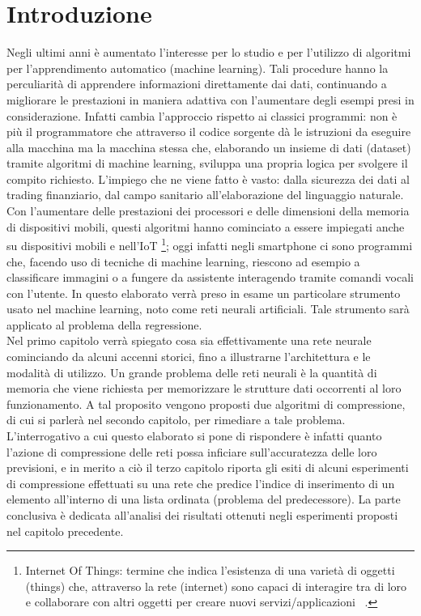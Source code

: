 \documentclass[12pt]{report}
\begin{document}


\tableofcontents

\linespread{1.4}\selectfont

\chapter*{Introduzione}
Negli ultimi anni è aumentato l'interesse per lo studio e per l'utilizzo di algoritmi per l'apprendimento automatico (machine learning). Tali procedure hanno la perculiarità di apprendere informazioni direttamente dai dati, continuando a migliorare le prestazioni in maniera adattiva con l'aumentare degli esempi presi in considerazione. Infatti cambia l'approccio rispetto ai classici programmi: non è più il programmatore che attraverso il codice sorgente dà le istruzioni da eseguire alla macchina ma la macchina stessa che, elaborando un insieme di dati (dataset) tramite algoritmi di machine learning, sviluppa una propria logica per svolgere il compito richiesto.
L'impiego che ne viene fatto è vasto: dalla sicurezza dei dati al trading finanziario, dal campo sanitario all'elaborazione del linguaggio naturale. Con l'aumentare delle prestazioni dei processori e delle dimensioni della memoria di dispositivi mobili, questi algoritmi hanno cominciato a essere impiegati anche su dispositivi mobili e nell'IoT \footnote{Internet Of Things: termine che indica l'esistenza di una varietà di oggetti (things) che, attraverso la rete (internet) sono capaci di interagire tra di loro e collaborare con altri oggetti per creare nuovi servizi/applicazioni ~\cite{IOT}.}; oggi infatti negli smartphone ci sono programmi che, facendo uso di tecniche di machine learning, riescono ad esempio a classificare immagini o a fungere da assistente interagendo tramite comandi vocali con l'utente. 
In questo elaborato verrà preso in esame un particolare strumento usato nel machine learning, noto come reti neurali artificiali. Tale strumento sarà applicato al problema della regressione. \\
Nel primo capitolo verrà spiegato cosa sia effettivamente una rete neurale cominciando da alcuni accenni storici, fino a illustrarne l'architettura e le modalità di utilizzo. Un grande problema delle reti neurali è la quantità di memoria che viene richiesta per memorizzare le strutture dati occorrenti al loro funzionamento. A tal proposito vengono proposti due algoritmi di compressione, di cui si parlerà nel secondo capitolo, per rimediare a tale problema. L'interrogativo a cui questo elaborato si pone di rispondere è infatti quanto l'azione di compressione delle reti possa inficiare sull'accuratezza delle loro previsioni, e in merito a ciò il terzo capitolo riporta gli esiti di alcuni esperimenti di compressione effettuati su una rete che predice l'indice di inserimento di un elemento all'interno di una lista ordinata (problema del predecessore).
La parte conclusiva è dedicata all'analisi dei risultati ottenuti negli esperimenti proposti nel capitolo precedente.
\end{document}
